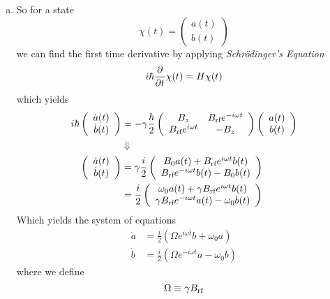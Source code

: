 \documentclass[11pt]{article}
\numberwithin{equation}{section}
\newcommand{\Brf}{B_{\textnormal{rf}}}
\begin{document}
\begin{enumerate}[(a)]
\item
So for a state
$$\chi(t) = \left(\begin{array}{c}a(t)\\b(t)\end{array}\right)$$
we can find the first time derivative by applying \emph{Schr\"{o}dinger's Equation}
$$i\hbar\frac{\partial{}}{\partial{t}}\chi(t) = H\chi(t)$$
which yields
\begin{align*}
i\hbar\left(\begin{array}{c}\dot{a}(t)\\\dot{b}(t)\end{array}\right)  &= -\gamma\frac{\hbar}{2}\left(\begin{array}{cc}
               B_z      &B_{\textnormal{rf}}e^{-i\omega t}\\
               B_{\textnormal{rf}}e^{i\omega t}    &-B_z \\
               \end{array}\right)\left(\begin{array}{c}a(t)\\b(t)\end{array}\right)\\
&\Downarrow\\
\left(\begin{array}{c}\dot{a}(t)\\\dot{b}(t)\end{array}\right)  &= \gamma\frac{i}{2}\left(\begin{array}{c}
               B_0a(t) + \Brf e^{i\omega t}b(t)\\
               \Brf e^{-i\omega t}b(t) - B_0b(t)\\
               \end{array}\right)\\
&= \frac{i}{2}\left(\begin{array}{c}
               \omega_0a(t) + \gamma\Brf e^{i\omega t}b(t)\\
               \gamma\Brf e^{-i\omega t}a(t) - \omega_0b(t)\\
               \end{array}\right)
\end{align*}
Which yields the system of equations
\begin{align*}
\dot{a} &= \frac{i}{2}\left(\Omega e^{i\omega t}b + \omega_0a\right)\\
\dot{b} &= \frac{i}{2}\left(\Omega e^{-i\omega t}a - \omega_0b\right)
\end{align*}
where we define
$$\Omega\equiv\gamma\Brf$$


\end{enumerate}
\end{document}

